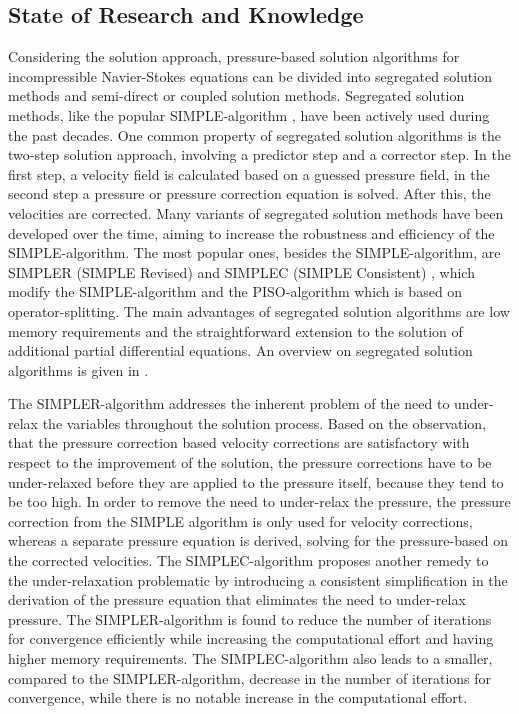 \subsection{State of Research and Knowledge}

Considering the solution approach, pressure-based solution algorithms for incompressible Navier-Stokes equations can be divided into segregated solution methods and semi-direct or coupled solution methods. Segregated solution methods, like the popular SIMPLE-algorithm \cite{patankar72}, have been actively used during the past decades. One common property of segregated solution algorithms is the two-step solution approach, involving a predictor step and a corrector step. In the first step, a velocity field is calculated based on a guessed pressure field, in the second step a pressure or pressure correction equation is solved. After this, the velocities are corrected. Many variants of segregated solution methods have been developed over the time, aiming to increase the robustness and efficiency of the SIMPLE-algorithm. The most popular ones, besides the SIMPLE-algorithm, are SIMPLER (SIMPLE Revised) \cite{patankar80} and SIMPLEC (SIMPLE Consistent) \cite{doormaal84}, which modify the SIMPLE-algorithm and the PISO-algorithm which is based on operator-splitting. The main advantages of segregated solution algorithms are low memory requirements and the straightforward extension to the solution of additional partial differential equations. An overview on segregated solution algorithms is given in \cite{darwish00}.

The SIMPLER-algorithm addresses the inherent problem of the need to under-relax the variables throughout the solution process. Based on the observation, that the pressure correction based velocity corrections are satisfactory with respect to the improvement of the solution, the pressure corrections have to be under-relaxed before they are applied to the pressure itself, because they tend to be too high. In order to remove the need to under-relax the pressure, the pressure correction from the SIMPLE algorithm is only used for velocity corrections, whereas a separate pressure equation is derived, solving for the pressure-based on the corrected velocities. The SIMPLEC-algorithm proposes another remedy to the under-relaxation problematic by introducing a consistent simplification in the derivation of the pressure equation that eliminates the need to under-relax pressure. The SIMPLER-algorithm is found to reduce the number of iterations for convergence efficiently while increasing the computational effort and having higher memory requirements. The SIMPLEC-algorithm also leads to a smaller, compared to the SIMPLER-algorithm, decrease in the number of iterations for convergence, while there is no notable increase in the computational effort. 

